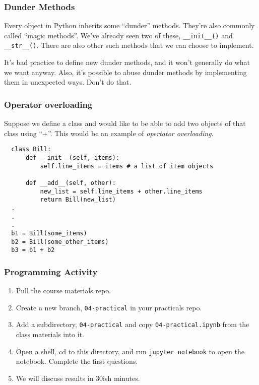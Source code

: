 \documentclass[10pt]{beamer}
\begin{document}
\begin{frame}
  \frametitle{Dunder Methods}
  
  Every object in Python inherits some ``dunder'' methods. They're
  also commonly called ``magic methods''. We've already seen two of these, 
  \texttt{\_\_init\_\_()} and  \texttt{\_\_str\_\_()}. There are also other such methods
  that we can choose to implement.
  
  \vspace{5mm}
  It's bad practice to define new dunder methods, and it won't generally do what we want 
  anyway. Also, it's possible to abuse dunder methods by implementing them in unexpected ways.
  Don't do that.
\end{frame}

\begin{frame}[fragile]
  \frametitle{Operator overloading}
  Suppose we define a class and would like to be able to add two objects of that 
  class using ``+''. This would be an example of \emph{opertator overloading}.
  
  \begin{verbatim}
  class Bill:
      def __init__(self, items):
          self.line_items = items # a list of item objects
          
      def __add__(self, other):
          new_list = self.line_items + other.line_items
          return Bill(new_list)
  .
  .
  .        
  b1 = Bill(some_items)            
  b2 = Bill(some_other_items)
  b3 = b1 + b2
  \end{verbatim}
\end{frame}

\begin{frame}
  \frametitle{Programming Activity}
  
  \begin{enumerate}
    \item Pull the course materials repo.
    \item Create a new branch, \texttt{04-practical} in your practicals repo.
    \item Add a subdirectory,  \texttt{04-practical} and copy \texttt{04-practical.ipynb} from the class materials into it.
    \item Open a shell, cd to this directory, and run \texttt{jupyter notebook} to open the notebook. Complete the first questions.
    \item We will discuss results in 30ish minutes.
  \end{enumerate}      
\end{frame}
\end{document}
